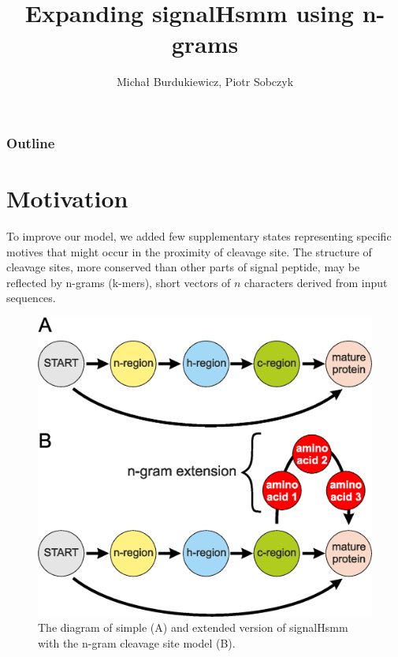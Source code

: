 \documentclass[10pt]{beamer}\usepackage[]{graphicx}\usepackage[]{color}
\begin{document}
\date{}
\author{Micha\l{}  Burdukiewicz, Piotr Sobczyk}

\title{Expanding signalHsmm using n-grams}


\begin{frame}
\maketitle





\end{frame}

\begin{frame}
\frametitle{Outline}
\tableofcontents
\end{frame}

\section{Motivation}


\begin{frame}
To improve our model, we added few supplementary states representing specific motives that might occur in the proximity of cleavage site. The structure of cleavage sites, more conserved than other parts of signal peptide, may be reflected by n-grams (k-mers), short vectors of $n$ characters derived from input sequences.
\end{frame}

\begin{frame}
\begin{figure}[ht]\centering
\includegraphics[scale=0.42]{HSMMs}
\caption{The diagram of simple (A) and extended version of signalHsmm with the n-gram cleavage site model (B).}
\label{fig:enccomp}
\end{figure}

\end{frame}
\end{document}
